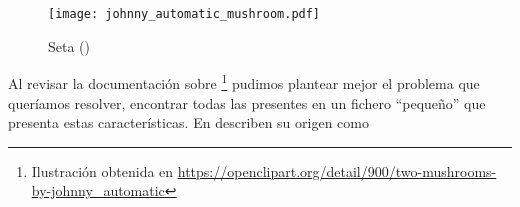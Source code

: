 \ABIERTO

\begin{wrapfigure}{o}{0.24\textwidth}
  \centering
  \texttt{[image: johnny\_automatic\_mushroom.pdf]}
	\caption{Seta (\mushroom)}
	\label{fig:Seta}
\end{wrapfigure}
Al revisar la documentación sobre \mushroom\footnote{Ilustración obtenida en {\scriptsize\url{https://openclipart.org/detail/900/two-mushrooms-by-johnny_automatic}}} pudimos plantear mejor el problema que queríamos resolver, encontrar todas las \ARs presentes en un fichero "`pequeño"' que presenta estas características. En  describen su origen como




